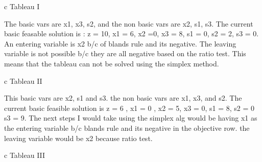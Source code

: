 \begin{enumerate}
\begin{center}
  \begin{tabular}{c}
  Tableau I\\
\end{tabular} 
\end{center}


The basic vars are x1, x3, s2, and the non basic vars are x2, s1, s3. The current basic feasable solution is : z = 10, x1 = 6, x2 =0, x3 = 8, s1 = 0, s2 = 2, s3 = 0. An entering variable is x2 b/c of blands rule and its negative. The leaving variable is not possible b/c they are all negative based on the ratio test. This means that the tableau can not be solved using the simplex method. 


\begin{center}
  \begin{tabular}{c}
    Tableau II \\
  \end{tabular}
\end{center}


This basic vars are x2, s1 and s3. the non basic vars are x1, x3, and s2. The current basic feasible solution is z = 6 , x1 = 0 , x2 = 5, x3 = 0, s1 = 8, s2 = 0 s3 = 9. The next steps I would take using the simplex alg would be having x1 as the entering variable b/c blands rule and its negative in the objective row. the leaving variable would be x2 because ratio test. 



\begin{center}
  \begin{tabular}{c} 
    Tableau III\\
\end{tabular}
\end{center}
 \end{enumerate}

